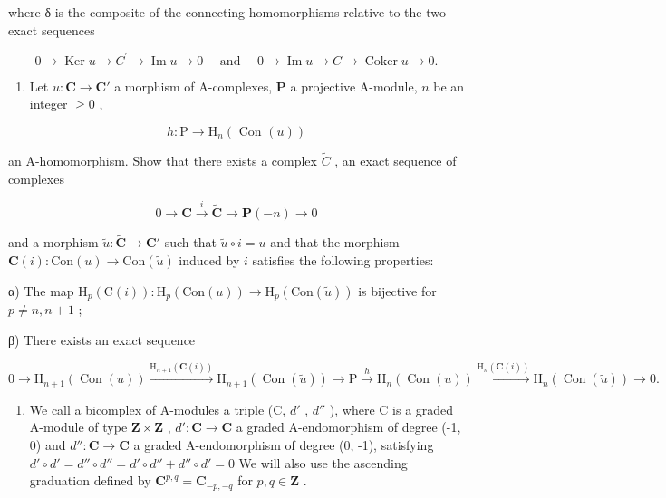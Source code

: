 where δ is the composite of the connecting homomorphisms relative to the two exact sequences

\[
0 \rightarrow \operatorname{Ker} u \rightarrow C ^ {\prime} \rightarrow \operatorname{Im} u \rightarrow 0 \quad \text { and } \quad 0 \rightarrow \operatorname{Im} u \rightarrow C \rightarrow \operatorname{Coker} u \rightarrow 0.
\]

\begin{enumerate}
\def\labelenumi{\arabic{enumi})}
\setcounter{enumi}{9}
\tightlist
\item
  Let \(u: \mathbf{C} \to \mathbf{C}'\) a morphism of A-complexes, \(\mathbf{P}\) a projective A-module, \(n\) be an integer \(\geqslant 0\) ,
\end{enumerate}

\[
h: \mathrm{P} \rightarrow \mathrm{H} _ {n} (\text { Con } (u))
\]

an A-homomorphism. Show that there exists a complex \(\tilde{C}\) , an exact sequence of complexes

\[
0 \to \mathbf {C} \xrightarrow {i} \tilde {\mathbf {C}} \to \mathbf {P} (- n) \to 0
\]

and a morphism \(\tilde{u}:\tilde{\mathbf{C}}\to \mathbf{C}'\) such that \(\tilde{u}\circ i = u\) and that the morphism \(\mathbf{C}(i):\mathrm{Con}(u)\to \mathrm{Con}(\tilde{u})\) induced by \(i\) satisfies the following properties:

α) The map \(\mathrm{H}_{p}(\mathrm{C}(i)) : \mathrm{H}_{p}(\mathrm{Con}(u)) \to \mathrm{H}_{p}(\mathrm{Con}(\tilde{u}))\) is bijective for \(p \neq n, n + 1\) ;

β) There exists an exact sequence

\[
0 \rightarrow \mathrm{H} _ {n + 1} (\operatorname{Con} (u)) \xrightarrow {\mathrm{H} _ {n + 1} (\mathbf {C} (i))} \mathrm{H} _ {n + 1} (\operatorname{Con} (\tilde {u})) \rightarrow \mathrm{P} \xrightarrow {h} \mathrm{H} _ {n} (\operatorname{Con} (u)) \xrightarrow {\mathrm{H} _ {n} (\mathbf {C} (i))} \mathrm{H} _ {n} (\operatorname{Con} (\tilde {u})) \rightarrow 0.
\]

\begin{enumerate}
\def\labelenumi{\arabic{enumi})}
\setcounter{enumi}{10}
\tightlist
\item
  We call a bicomplex of A-modules a triple (C, \(d'\) , \(d''\) ), where C is a graded A-module of type \(\mathbf{Z} \times \mathbf{Z}\) , \(d': \mathbf{C} \to \mathbf{C}\) a graded A-endomorphism of degree (-1, 0) and \(d'': \mathbf{C} \to \mathbf{C}\) a graded A-endomorphism of degree (0, -1), satisfying \(d' \circ d' = d'' \circ d'' = d' \circ d'' + d'' \circ d' = 0\) We will also use the ascending graduation defined by \(\mathbf{C}^{p,q} = \mathbf{C}_{-p,-q}\) for \(p, q \in \mathbf{Z}\) .
\end{enumerate}

